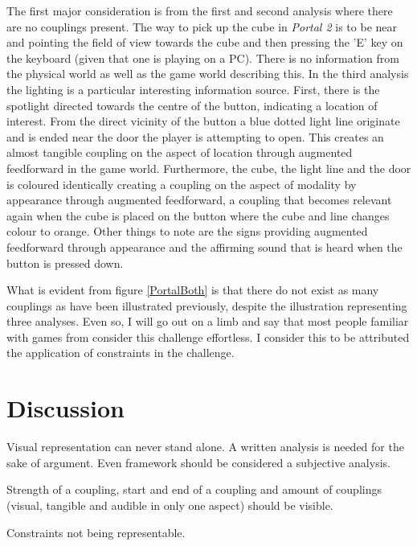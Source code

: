 The first major consideration is from the first and second analysis where there are no couplings present. The way to pick up the cube in \textit{Portal 2} is to be near and pointing the field of view towards the cube and then pressing the 'E' key on the keyboard (given that one is playing on a PC). There is no information from the physical world as well as the game world describing this. In the third analysis the lighting is a particular interesting information source. First, there is the spotlight directed towards the centre of the button, indicating a location of interest. From the direct vicinity of the button a blue dotted light line originate and is ended near the door the player is attempting to open. This creates an almost tangible coupling on the aspect of location through augmented feedforward in the game world. Furthermore, the cube, the light line and the door is coloured identically creating a coupling on the aspect of modality by appearance through augmented feedforward, a coupling that becomes relevant again when the cube is placed on the button where the cube and line changes colour to orange. Other things to note are the signs providing augmented feedforward through appearance and the affirming sound that is heard when the button is pressed down.

What is evident from figure \ref{PortalBoth} is that there do not exist as many couplings as have been illustrated previously, despite the illustration representing three analyses. Even so, I will go out on a limb and say that most people familiar with games from  consider this challenge effortless. I consider this to be attributed the application of constraints in the challenge.

\section{Discussion}
Visual representation can never stand alone. A written analysis is needed for the sake of argument. Even framework should be considered a subjective analysis.

Strength of a coupling, start and end of a coupling and amount of couplings (visual, tangible and audible in only one aspect) should be visible.

Constraints not being representable.
